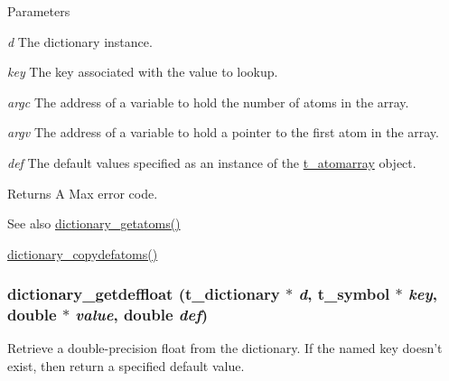 \begin{DoxyParams}{Parameters}
\item[{\em d}]The dictionary instance. \item[{\em key}]The key associated with the value to lookup. \item[{\em argc}]The address of a variable to hold the number of atoms in the array. \item[{\em argv}]The address of a variable to hold a pointer to the first atom in the array. \item[{\em def}]The default values specified as an instance of the \hyperlink{structt__atomarray}{t\_\-atomarray} object. \end{DoxyParams}
\begin{DoxyReturn}{Returns}
A Max error code.
\end{DoxyReturn}
\begin{DoxySeeAlso}{See also}
\hyperlink{group__dictionary_gacda8208be5d424b81387258098bdbaa1}{dictionary\_\-getatoms()} 

\hyperlink{group__dictionary_gaa886af0aad9db9bc6b08314b9b5672f9}{dictionary\_\-copydefatoms()} 
\end{DoxySeeAlso}
\hypertarget{group__dictionary_ga2c988f18fa22ab56aac4464bc7140438}{
\subsubsection[{dictionary\_\-getdeffloat}]{ dictionary\_\-getdeffloat ({\bf t\_\-dictionary} $\ast$ {\em d}, \/  {\bf t\_\-symbol} $\ast$ {\em key}, \/  double $\ast$ {\em value}, \/  double {\em def})}}
\label{group__dictionary_ga2c988f18fa22ab56aac4464bc7140438}


Retrieve a double-\/precision float from the dictionary. If the named key doesn't exist, then return a specified default value.


